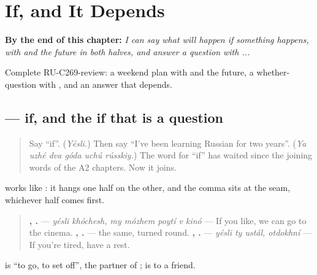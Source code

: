 
\chapter{If, and It Depends}
\label{ch:ru-if-and-it-depends}

\begin{chapteropening}
\textbf{By the end of this chapter:} \emph{I can say what will happen if something happens, with  and the future in both halves, and answer a question with    ...}

Complete RU-C269-review: a weekend plan with  and the future, a whether-question with , and an answer that depends.
\end{chapteropening}

\section[\texorpdfstring{\ru{если} …, … (yésli …, …)}{если …, … (yésli …, …)}]{ — if, and the if that is a question}

\label{lesson:RU-C269-yesli}



\begin{quote}
Say \textquotedblleft{}if\textquotedblright{}. (\emph{Yésli.}) Then say \textquotedblleft{}I've been learning Russian for two years\textquotedblright{}. (\emph{Ya uzhé dva góda uchú rússkiy.}) The word for \textquotedblleft{}if\textquotedblright{} has waited since the joining words of the A2 chapters. Now it joins.
\end{quote}

\begin{grammarlens}[title={Grammar Lens: a condition and a comma}]
\textbf{} works like \emph{}: it hangs one half on the other, and the comma sits at the seam, whichever half comes first.

\begin{quote}
\textbf{ ,     .} — \emph{yésli khóchesh, my mózhem poytí v kinó} — If you like, we can go to the cinema. \textbf{    ,  .} — the same, turned round. \textbf{  , .} — \emph{yésli ty ustál, otdokhní} — If you're tired, have a rest.
\end{quote}

\emph{} is \textquotedblleft{}to go, to set off\textquotedblright{}, the partner of \emph{}; \emph{} is \emph{} to a friend.
\end{grammarlens}


